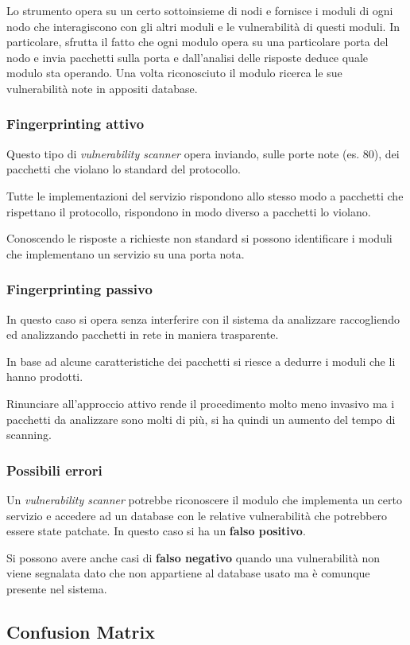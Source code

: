 Lo strumento opera su un certo sottoinsieme di nodi e fornisce i moduli di ogni nodo che interagiscono con gli altri
moduli e le vulnerabilità di questi moduli. In particolare, sfrutta il fatto che ogni modulo opera su una particolare
porta del nodo e invia pacchetti sulla porta e dall'analisi delle risposte deduce quale modulo sta operando. Una volta
riconosciuto il modulo ricerca le sue vulnerabilità note in appositi database.

\subsubsection{Fingerprinting attivo}
Questo tipo di \emph{vulnerability scanner} opera inviando, sulle porte note (es. 80), dei pacchetti che violano lo
standard del protocollo.

Tutte le implementazioni del servizio rispondono allo stesso modo a pacchetti che rispettano il protocollo, rispondono
in modo diverso a pacchetti lo violano.

Conoscendo le risposte a richieste non standard si possono identificare i moduli che implementano un servizio su una
porta nota.

\subsubsection{Fingerprinting passivo}
In questo caso si opera senza interferire con il sistema da analizzare raccogliendo ed analizzando pacchetti in rete
in maniera trasparente.

In base ad alcune caratteristiche dei pacchetti si riesce a dedurre i moduli che li hanno prodotti.

Rinunciare all'approccio attivo rende il procedimento molto meno invasivo ma i pacchetti da analizzare sono molti di
più, si ha quindi un aumento del tempo di scanning.

\subsubsection{Possibili errori}
Un \emph{vulnerability scanner} potrebbe riconoscere il modulo che implementa un certo servizio e accedere ad un
database con le relative vulnerabilità che potrebbero essere state patchate. In questo caso si ha un \textbf{falso
	positivo}.

Si possono avere anche casi di \textbf{falso negativo} quando una vulnerabilità non viene segnalata dato che non
appartiene al database usato ma è comunque presente nel sistema.

\subsection{Confusion Matrix}